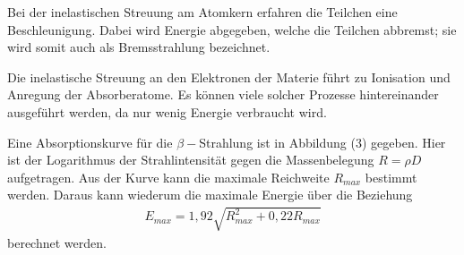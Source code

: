 Bei der inelastischen Streuung am Atomkern erfahren die Teilchen eine Beschleunigung. Dabei wird Energie abgegeben, welche die Teilchen abbremst; sie wird somit auch als Bremsstrahlung bezeichnet.

Die inelastische Streuung an den Elektronen der Materie führt zu Ionisation und Anregung der Absorberatome. Es können viele solcher Prozesse hintereinander ausgeführt werden, da nur wenig Energie verbraucht wird. 

Eine Absorptionskurve für die $\beta-$Strahlung ist in Abbildung (3) gegeben. 
Hier ist der Logarithmus der Strahlintensität gegen die Massenbelegung $R = \rho D$ aufgetragen. Aus der Kurve kann die maximale Reichweite $R_{max}$ bestimmt werden.
Daraus kann wiederum die maximale Energie über die Beziehung
\begin{align}
  E_{max} = 1,92 \sqrt{R_{max}^2 + 0,22 R_{max}}
\end{align}
berechnet werden.
